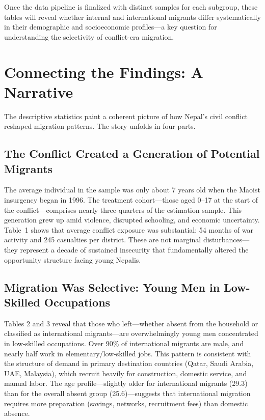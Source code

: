 \documentclass[12pt,letterpaper]{article}
\begin{document}
Once the data pipeline is finalized with distinct samples for each subgroup, these tables will reveal whether internal and international migrants differ systematically in their demographic and socioeconomic profiles---a key question for understanding the selectivity of conflict-era migration.


\section{Connecting the Findings: A Narrative}

The descriptive statistics paint a coherent picture of how Nepal's civil conflict reshaped migration patterns. The story unfolds in four parts.

\subsection{The Conflict Created a Generation of Potential Migrants}

The average individual in the sample was only about 7 years old when the Maoist insurgency began in 1996. The treatment cohort---those aged 0--17 at the start of the conflict---comprises nearly three-quarters of the estimation sample. This generation grew up amid violence, disrupted schooling, and economic uncertainty. Table~1 shows that average conflict exposure was substantial: 54 months of war activity and 245 casualties per district. These are not marginal disturbances---they represent a decade of sustained insecurity that fundamentally altered the opportunity structure facing young Nepalis.

\subsection{Migration Was Selective: Young Men in Low-Skilled Occupations}

Tables 2 and 3 reveal that those who left---whether absent from the household or classified as international migrants---are overwhelmingly young men concentrated in low-skilled occupations. Over 90\% of international migrants are male, and nearly half work in elementary/low-skilled jobs. This pattern is consistent with the structure of demand in primary destination countries (Qatar, Saudi Arabia, UAE, Malaysia), which recruit heavily for construction, domestic service, and manual labor. The age profile---slightly older for international migrants (29.3) than for the overall absent group (25.6)---suggests that international migration requires more preparation (savings, networks, recruitment fees) than domestic absence.
\end{document}
